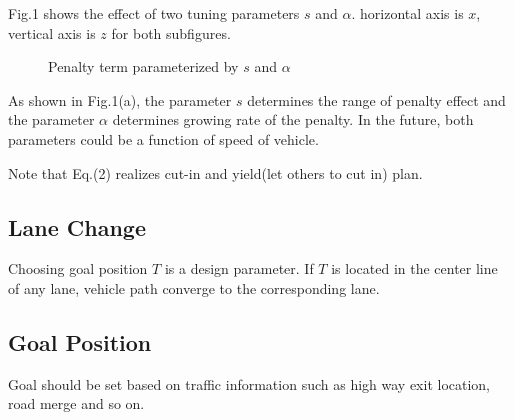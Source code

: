\documentclass[12pt]{article}
\begin{document}
Fig.1 shows the effect of two tuning parameters $s$ and $\alpha$.
horizontal axis is $x$, vertical axis is $z$ for both subfigures.
\begin{figure}[h!]
\begin{centering}
\par\end{centering}
\caption{Penalty term parameterized by $s$ and $\alpha$ }
\end{figure}
As shown in Fig.1(a), the parameter $s$ determines the range of penalty effect and the parameter $\alpha$ determines growing rate of the penalty. In the future, both parameters could be a function of speed of vehicle.

Note that Eq.(2) realizes cut-in and yield(let others to cut in) plan. 

\subsection*{Lane Change}
Choosing goal position $T$ is a design parameter. If $T$ is located in the center line of any lane, vehicle path converge to the corresponding lane.

\subsection*{Goal Position}
Goal should be set based on traffic information such as high way exit location, road merge and so on. 
\end{document}
